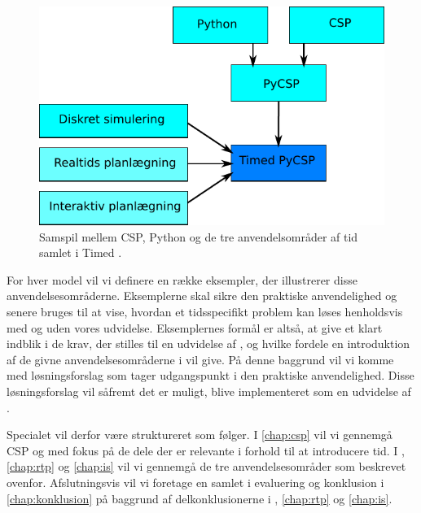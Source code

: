 \begin{figure}[htp]
 \begin{center}
  \includegraphics[scale=0.8]{images/intro}
	\caption{Samspil mellem CSP, Python og de tre anvendelsområder af tid samlet i Timed \pycsp .}
	\label{fig:intro}
\end{center}
\end{figure}

For hver model vil vi definere en række eksempler, der illustrerer disse anvendelsesområderne. Eksemplerne skal sikre den praktiske anvendelighed og senere bruges til at vise, hvordan et tidsspecifikt problem kan løses henholdsvis med og uden vores udvidelse. Eksemplernes formål er altså, at give et klart indblik i de krav, der stilles til en udvidelse af \pycsp, og hvilke fordele en introduktion af de givne anvendelsesområderne i \pycsp vil give. På denne baggrund vil vi komme med løsningsforslag som tager udgangspunkt i den praktiske anvendelighed. Disse løsningsforslag vil såfremt det er muligt, blive implementeret som en udvidelse af \pycsp.

Specialet vil derfor være struktureret som følger. I \autoref{chap:csp} vil vi gennemgå CSP og \pycsp med fokus på de dele der er relevante i forhold til at introducere tid. I , \ref{chap:rtp} og \ref{chap:is} vil vi gennemgå de tre anvendelsesområder som beskrevet ovenfor. Afslutningsvis vil vi foretage en samlet i evaluering og konklusion i \autoref{chap:konklusion} på baggrund af delkonklusionerne i , \ref{chap:rtp} og \ref{chap:is}.


